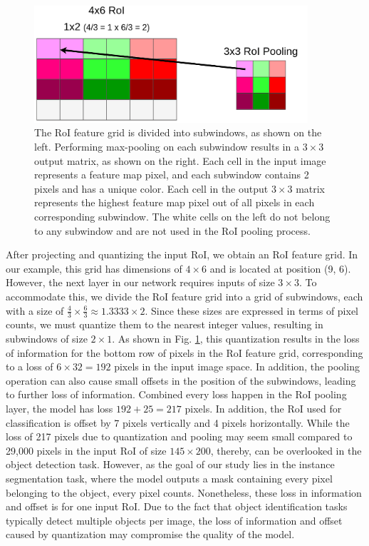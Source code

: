 \begin{figure}[!ht]
    \centering
    \includegraphics[width=4in]{figures/roi_pool_ex.png}
    \caption{The RoI feature grid is divided into subwindows, as shown on the left. Performing max-pooling on each subwindow results in a $3 \times 3$ output matrix, as shown on the right. Each cell in the input image represents a feature map pixel, and each subwindow contains 2 pixels and has a unique color. Each cell in the output $3 \times 3$ matrix represents the highest feature map pixel out of all pixels in each corresponding subwindow. The white cells on the left do not belong to any subwindow and are not used in the RoI pooling process.\cite{roi_pooling_problem}}
    \label{fig:roi_pool_ex}
\end{figure}
After projecting and quantizing the input RoI, we obtain an RoI feature grid. In our example, this grid has dimensions of $4 \times 6$ and is located at position (9, 6). However, the next layer in our network requires inputs of size $3 \times 3$. To accommodate this, we divide the RoI feature grid into a grid of subwindows, each with a size of $\frac{4}{3} \times \frac{6}{3} \approx 1.3333 \times 2$. Since these sizes are expressed in terms of pixel counts, we must quantize them to the nearest integer values, resulting in subwindows of size $2 \times 1$. As shown in Fig. \ref{fig:roi_pool_ex}, this quantization results in the loss of information for the bottom row of pixels in the RoI feature grid, corresponding to a loss of $6 \times 32 = 192$ pixels in the input image space. In addition, the pooling operation can also cause small offsets in the position of the subwindows, leading to further loss of information. Combined every loss happen in the RoI pooling layer, the model has loss $192+25=217$ pixels. In addition, the RoI used for classification is offset by 7 pixels vertically and 4 pixels horizontally. While the loss of 217 pixels due to quantization and pooling may seem small compared to 29,000 pixels in the input RoI of size $145 \times 200$, thereby, can be overlooked in the object detection task. However, as the goal of our study lies in the instance segmentation task, where the model outputs a mask containing every pixel belonging to the object, every pixel counts. Nonetheless, these loss in information and offset is for one input RoI. Due to the fact that object identification tasks typically detect multiple objects per image, the loss of information and offset caused by quantization may compromise the quality of the model. 

